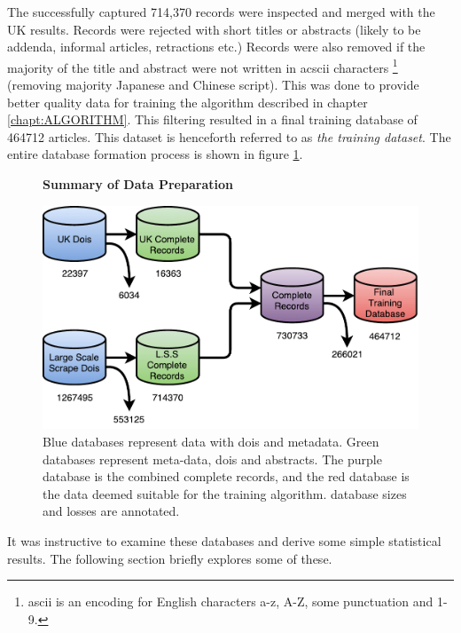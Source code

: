The successfully captured 714,370 records were inspected and merged with the UK results. Records were rejected with short titles or abstracts (likely to be addenda, informal articles, retractions etc.) Records were also removed if the majority of the title and abstract were not written in acscii characters \footnote{ascii is an encoding for English characters a-z, A-Z, some punctuation and 1-9.} (removing majority Japanese and Chinese script). This was done to provide better quality data for training the algorithm described in chapter \ref{chapt:ALGORITHM}. This filtering resulted in a final training database of 464712 articles. This dataset is henceforth referred to as \emph{the training dataset}. The entire database formation process is shown in figure \ref{fig:DATABASES}.
\begin{figure}[H]
    \centering
    \textbf{Summary of Data Preparation}\par\medskip
    \includegraphics[scale=0.6]{Data_Acquisition/Databases.pdf}
    \caption{Blue databases represent data with dois and metadata. Green databases represent meta-data, dois and abstracts. The purple database is the combined complete records, and the red database is the data deemed suitable for the training algorithm. database sizes and losses are annotated.}
     \label{fig:DATABASES}
\end{figure}


It was instructive to examine these databases and derive some simple statistical results. The following section briefly explores some of these.
